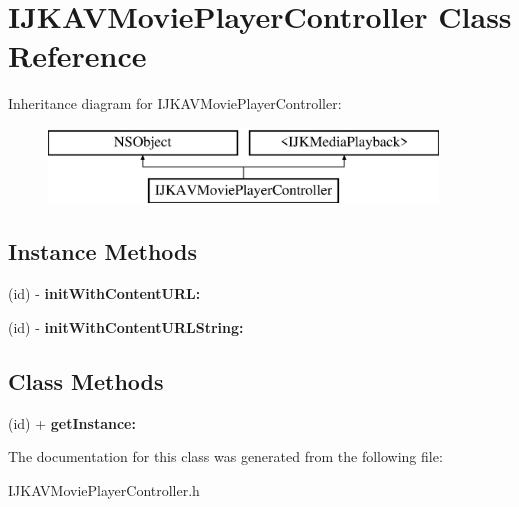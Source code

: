 \hypertarget{interface_i_j_k_a_v_movie_player_controller}{}\section{I\+J\+K\+A\+V\+Movie\+Player\+Controller Class Reference}
\label{interface_i_j_k_a_v_movie_player_controller}
Inheritance diagram for I\+J\+K\+A\+V\+Movie\+Player\+Controller\+:\begin{figure}[H]
\begin{center}
\leavevmode
\includegraphics[height=2.000000cm]{interface_i_j_k_a_v_movie_player_controller}
\end{center}
\end{figure}
\subsection*{Instance Methods}
\begin{DoxyCompactItemize}
\item 
\mbox{\label{interface_i_j_k_a_v_movie_player_controller_aa5577992e0ec0e08d005551db18a7404}} 
(id) -\/ {\bfseries init\+With\+Content\+U\+R\+L\+:}
\item 
\mbox{\label{interface_i_j_k_a_v_movie_player_controller_aab57326b5b5d69b8ef1b16d1da2d0c59}} 
(id) -\/ {\bfseries init\+With\+Content\+U\+R\+L\+String\+:}
\end{DoxyCompactItemize}
\subsection*{Class Methods}
\begin{DoxyCompactItemize}
\item 
\mbox{\label{interface_i_j_k_a_v_movie_player_controller_aba8ce410fac68355c28f134003f9d7eb}} 
(id) + {\bfseries get\+Instance\+:}
\end{DoxyCompactItemize}


The documentation for this class was generated from the following file\+:\begin{DoxyCompactItemize}
\item 
I\+J\+K\+A\+V\+Movie\+Player\+Controller.\+h\end{DoxyCompactItemize}
